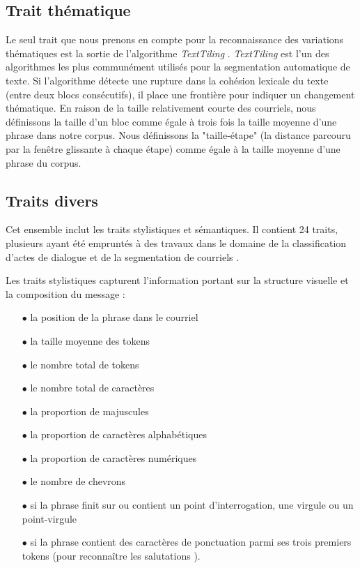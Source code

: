 \subsection{Trait thématique}

Le seul trait que nous prenons en compte pour la reconnaissance des variations thématiques est la sortie de l'algorithme \textit{TextTiling} \cite{hearst1997texttiling}. \textit{TextTiling} est l'un des algorithmes les plus communément utilisés pour la segmentation automatique de texte. Si l'algorithme détecte une rupture dans la cohésion lexicale du texte (entre deux blocs consécutifs), il place une frontière pour indiquer un changement thématique. En raison de la taille relativement courte des courriels, nous définissons la taille d'un bloc comme égale à trois fois la taille moyenne d'une phrase dans notre corpus. Nous définissons la "taille-étape" (la distance parcouru par la fenêtre glissante à chaque étape) comme égale à la taille moyenne d'une phrase du corpus.

\subsection{Traits divers}

Cet ensemble inclut les traits stylistiques et sémantiques. Il contient 24 traits, plusieurs ayant été empruntés à des travaux dans le domaine de la classification d'actes de dialogue \cite{qadir2011classifying} et de la segmentation de courriels \cite{lampert2009segmenting}. 

Les traits stylistiques capturent l'information portant sur la structure visuelle et la composition du message : 

\begin{itemize}
	\item[$\bullet$] la position de la phrase dans le courriel
	\item[$\bullet$] la taille moyenne des tokens
	\item[$\bullet$] le nombre total de tokens 
	\item[$\bullet$] le nombre total de caractères
	\item[$\bullet$] la proportion de majuscules
	\item[$\bullet$] la proportion de caractères alphabétiques
	\item[$\bullet$] la proportion de caractères numériques
	\item[$\bullet$] le nombre de chevrons
	\item[$\bullet$] si la phrase finit sur ou contient un point d'interrogation, une virgule ou un point-virgule
	\item[$\bullet$] si la phrase contient des caractères de ponctuation parmi ses trois premiers tokens (pour reconnaître les salutations \cite{qadir2011classifying}).
\end{itemize}

